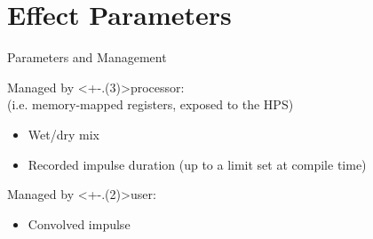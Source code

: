 \section{Effect Parameters}


\begin{frame}{Parameters and Management}

    Managed by \alert<+-.(3)>{processor}: \\
    (i.e. memory-mapped registers, exposed to the HPS)

    \begin{itemize}[<+->]
        \item Wet/dry mix
        \item Recorded impulse duration (up to a limit set at compile time)
    \end{itemize}

    Managed by \alert<+-.(2)>{user}:

    \begin{itemize}[<+->]
        \item Convolved impulse
    \end{itemize}

\end{frame}
